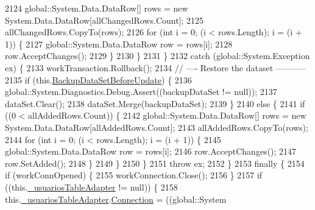 \begin{DoxyCode}
2124                     global::System.Data.DataRow[] rows = \textcolor{keyword}{new} System.Data.DataRow[allChangedRows.Count];
2125                     allChangedRows.CopyTo(rows);
2126                     \textcolor{keywordflow}{for} (\textcolor{keywordtype}{int} i = 0; (i < rows.Length); i = (i + 1)) \{
2127                         global::System.Data.DataRow row = rows[i];
2128                         row.AcceptChanges();
2129                     \}
2130                 \}
2131             \}
2132             \textcolor{keywordflow}{catch} (global::System.Exception ex) \{
2133                 workTransaction.Rollback();
2134                 \textcolor{comment}{// ---- Restore the dataset -----------}
2135                 \textcolor{keywordflow}{if} (this.\hyperlink{class_proyecto___integrador__3_1_1ds_usuarios_table_adapters_1_1_table_adapter_manager_a289a0afd6e556f8088de0f56498e45d1}{BackupDataSetBeforeUpdate}) \{
2136                     global::System.Diagnostics.Debug.Assert((backupDataSet != null));
2137                     dataSet.Clear();
2138                     dataSet.Merge(backupDataSet);
2139                 \}
2140                 \textcolor{keywordflow}{else} \{
2141                     \textcolor{keywordflow}{if} ((0 < allAddedRows.Count)) \{
2142                         global::System.Data.DataRow[] rows = \textcolor{keyword}{new} System.Data.DataRow[allAddedRows.Count];
2143                         allAddedRows.CopyTo(rows);
2144                         \textcolor{keywordflow}{for} (\textcolor{keywordtype}{int} i = 0; (i < rows.Length); i = (i + 1)) \{
2145                             global::System.Data.DataRow row = rows[i];
2146                             row.AcceptChanges();
2147                             row.SetAdded();
2148                         \}
2149                     \}
2150                 \}
2151                 \textcolor{keywordflow}{throw} ex;
2152             \}
2153             \textcolor{keywordflow}{finally} \{
2154                 \textcolor{keywordflow}{if} (workConnOpened) \{
2155                     workConnection.Close();
2156                 \}
2157                 \textcolor{keywordflow}{if} ((this.\hyperlink{class_proyecto___integrador__3_1_1ds_usuarios_table_adapters_1_1_table_adapter_manager_abe0673c88efe0b34254112af02c6501c}{\_usuariosTableAdapter} != null)) \{
2158                     this.\hyperlink{class_proyecto___integrador__3_1_1ds_usuarios_table_adapters_1_1_table_adapter_manager_abe0673c88efe0b34254112af02c6501c}{\_usuariosTableAdapter}.\hyperlink{class_proyecto___integrador__3_1_1ds_usuarios_table_adapters_1_1_usuarios_table_adapter_a84b2a5b2b50b633d359dc7a29ce2e439}{Connection} = ((global::System

\end{DoxyCode}
